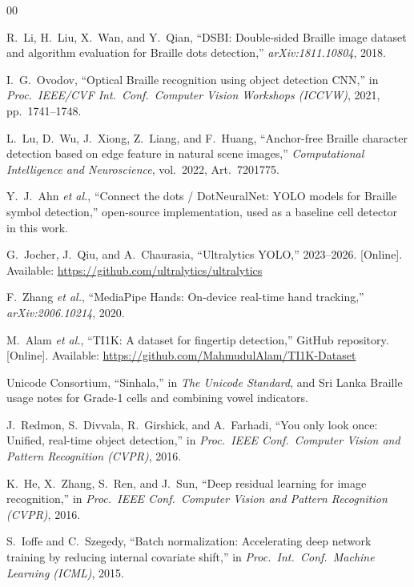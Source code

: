 \documentclass[conference]{IEEEtran}
\begin{document}
\begin{thebibliography}{00}

R.~Li, H.~Liu, X.~Wan, and Y.~Qian, ``DSBI: Double-sided Braille image
dataset and algorithm evaluation for Braille dots detection,''
\textit{arXiv:1811.10804}, 2018.

I.~G.~Ovodov, ``Optical Braille recognition using object detection CNN,''
in \textit{Proc.\ IEEE/CVF Int.\ Conf.\ Computer Vision Workshops
(ICCVW)}, 2021, pp.~1741--1748.

L.~Lu, D.~Wu, J.~Xiong, Z.~Liang, and F.~Huang, ``Anchor-free Braille
character detection based on edge feature in natural scene images,''
\textit{Computational Intelligence and Neuroscience}, vol.~2022,
Art.~7201775.

Y.~J.~Ahn \textit{et al.}, ``Connect the dots / DotNeuralNet: YOLO models
for Braille symbol detection,'' open-source implementation, used as a
baseline cell detector in this work.

G.~Jocher, J.~Qiu, and A.~Chaurasia, ``Ultralytics YOLO,'' 2023--2026.
[Online]. Available: \url{https://github.com/ultralytics/ultralytics}

F.~Zhang \textit{et al.}, ``MediaPipe Hands: On-device real-time hand
tracking,'' \textit{arXiv:2006.10214}, 2020.

M.~Alam \textit{et al.}, ``TI1K: A dataset for fingertip detection,''
GitHub repository.
[Online]. Available: \url{https://github.com/MahmudulAlam/TI1K-Dataset}

Unicode Consortium, ``Sinhala,'' in \textit{The Unicode Standard},
and Sri Lanka Braille usage notes for Grade-1 cells and combining
vowel indicators.

J.~Redmon, S.~Divvala, R.~Girshick, and A.~Farhadi, ``You only look
once: Unified, real-time object detection,'' in \textit{Proc.\ IEEE
Conf.\ Computer Vision and Pattern Recognition (CVPR)}, 2016.

K.~He, X.~Zhang, S.~Ren, and J.~Sun, ``Deep residual learning for image
recognition,'' in \textit{Proc.\ IEEE Conf.\ Computer Vision and Pattern
Recognition (CVPR)}, 2016.

S.~Ioffe and C.~Szegedy, ``Batch normalization: Accelerating deep
network training by reducing internal covariate shift,'' in
\textit{Proc.\ Int.\ Conf.\ Machine Learning (ICML)}, 2015.


\end{thebibliography}
\end{document}
